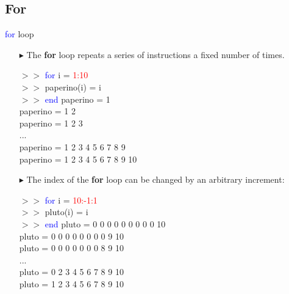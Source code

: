 \documentclass[xcolor={dvipsnames,rgb}, aspectratio=169]{beamer}
\begin{document}
\subsection{For}
\begin{frame}{\textcolor{blue}{for} loop}
    \begin{itemize}
        \item[$\blacktriangleright$] The \textbf{for} loop repeats a series of instructions a
              \alert{fixed number of times}.
              \begin{tcolorbox}[colback=white,colframe=bluepoli]
                  $>>$ \textcolor{blue}{for} i = \textcolor{red}{1:10}\\
                  $>>$ \hspace{1em}paperino(i) = i \\
                  $>>$ \textcolor{blue}{end}
                  \tcblower
                  paperino = 1 \\
                  paperino = 1 2\\
                  paperino = 1 2 3\\
                  ... \\
                  paperino = 1 2 3 4 5 6 7 8 9\\
                  paperino = 1 2 3 4 5 6 7 8 9 10
              \end{tcolorbox}
    \end{itemize}
\end{frame}

\begin{frame}{}
    \begin{itemize}
        \item[$\blacktriangleright$] The index of the \textbf{for} loop can be changed by an
              \alert{arbitrary increment}:
              \begin{tcolorbox}[colback=white,colframe=bluepoli]
                  $>>$ \textcolor{blue}{for} i = \textcolor{red}{10:-1:1}\\
                  $>>$ \hspace{1em}pluto(i) = i\\
                  $>>$ \textcolor{blue}{end}
                  \tcblower
                  pluto = 0 0 0 0 0 0 0 0 0 10 \\
                  pluto = 0 0 0 0 0 0 0 0 9 10 \\
                  pluto = 0 0 0 0 0 0 0 8 9 10 \\
                  ... \\
                  pluto = 0 2 3 4 5 6 7 8 9 10 \\
                  pluto = 1 2 3 4 5 6 7 8 9 10 \\
              \end{tcolorbox}
    \end{itemize}
\end{frame}
\end{document}
